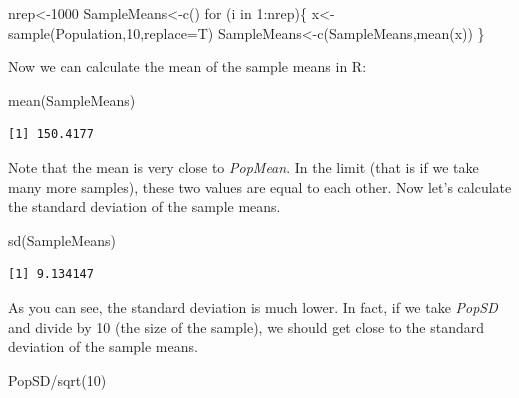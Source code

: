 \documentclass[
  letterpaper,
  DIV=11,
  numbers=noendperiod]{scrreprt}
\newenvironment{Shaded}{\begin{snugshade}}{\end{snugshade}}
\newcommand{\AttributeTok}[1]{\textcolor[rgb]{0.40,0.45,0.13}{#1}}
\newcommand{\ControlFlowTok}[1]{\textcolor[rgb]{0.00,0.23,0.31}{#1}}
\newcommand{\DecValTok}[1]{\textcolor[rgb]{0.68,0.00,0.00}{#1}}
\newcommand{\FunctionTok}[1]{\textcolor[rgb]{0.28,0.35,0.67}{#1}}
\newcommand{\NormalTok}[1]{\textcolor[rgb]{0.00,0.23,0.31}{#1}}
\newcommand{\OtherTok}[1]{\textcolor[rgb]{0.00,0.23,0.31}{#1}}
\newcommand{\SpecialCharTok}[1]{\textcolor[rgb]{0.37,0.37,0.37}{#1}}
\begin{document}
\begin{Shaded}
\begin{Highlighting}[numbers=left,,]
\NormalTok{nrep}\OtherTok{\textless{}{-}}\DecValTok{1000}
\NormalTok{SampleMeans}\OtherTok{\textless{}{-}}\FunctionTok{c}\NormalTok{()}
\ControlFlowTok{for}\NormalTok{ (i }\ControlFlowTok{in} \DecValTok{1}\SpecialCharTok{:}\NormalTok{nrep)\{}
\NormalTok{  x}\OtherTok{\textless{}{-}}\FunctionTok{sample}\NormalTok{(Population,}\DecValTok{10}\NormalTok{,}\AttributeTok{replace=}\NormalTok{T)}
\NormalTok{  SampleMeans}\OtherTok{\textless{}{-}}\FunctionTok{c}\NormalTok{(SampleMeans,}\FunctionTok{mean}\NormalTok{(x))}
\NormalTok{\}}
\end{Highlighting}
\end{Shaded}

Now we can calculate the mean of the sample means in R:

\begin{Shaded}
\begin{Highlighting}[numbers=left,,]
\FunctionTok{mean}\NormalTok{(SampleMeans)}
\end{Highlighting}
\end{Shaded}

\begin{verbatim}
[1] 150.4177
\end{verbatim}

Note that the mean is very close to \emph{PopMean}. In the limit (that
is if we take many more samples), these two values are equal to each
other. Now let's calculate the standard deviation of the sample means.

\begin{Shaded}
\begin{Highlighting}[numbers=left,,]
\FunctionTok{sd}\NormalTok{(SampleMeans)}
\end{Highlighting}
\end{Shaded}

\begin{verbatim}
[1] 9.134147
\end{verbatim}

As you can see, the standard deviation is much lower. In fact, if we
take \emph{PopSD} and divide by 10 (the size of the sample), we should
get close to the standard deviation of the sample means.

\begin{Shaded}
\begin{Highlighting}[numbers=left,,]
\NormalTok{PopSD}\SpecialCharTok{/}\FunctionTok{sqrt}\NormalTok{(}\DecValTok{10}\NormalTok{)}
\end{Highlighting}
\end{Shaded}
\end{document}
